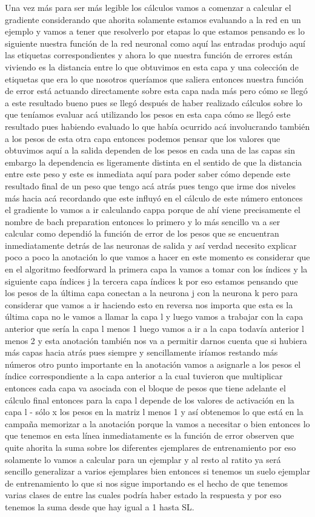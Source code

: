Una vez más para ser más legible los cálculos vamos a comenzar a calcular el gradiente considerando que ahorita solamente estamos evaluando a la red en un ejemplo y vamos a tener que resolverlo por etapas lo que estamos pensando es lo siguiente nuestra función de la red neuronal como aquí las entradas produjo aquí las etiquetas correspondientes y ahora lo que nuestra función de errores están viviendo es la distancia entre lo que obtuvimos en esta capa y una colección de etiquetas que era lo que nosotros queríamos que saliera entonces nuestra función de error está actuando directamente sobre esta capa nada más pero cómo se llegó a este resultado bueno pues se llegó después de haber realizado cálculos sobre lo que teníamos evaluar acá utilizando los pesos en esta capa cómo se llegó este resultado pues habiendo evaluado lo que había ocurrido acá involucrando también a los pesos de esta otra capa entonces podemos pensar que los valores que obtuvimos aquí a la salida dependen de los pesos en cada una de las capas sin embargo la dependencia es ligeramente distinta en el sentido de que la distancia entre este peso y este es inmediata aquí para poder saber cómo depende este resultado final de un peso que tengo acá atrás pues tengo que irme dos niveles más hacia acá recordando que este influyó en el cálculo de este número entonces el gradiente lo vamos a ir calculando cappa porque de ahí viene precisamente el nombre de bach preparation entonces lo primero y lo más sencillo va a ser calcular como dependió la función de error de los pesos que se encuentran inmediatamente detrás de las neuronas de salida y así verdad necesito explicar poco a poco la anotación lo que vamos a hacer en este momento es considerar que en el algoritmo feedforward la primera capa la vamos a tomar con los índices y la siguiente capa índices j la tercera capa índices k por eso estamos pensando que los pesos de la última capa conectan a la neurona j con la neurona k pero para considerar que vamos a ir haciendo esto en reversa nos importa que esta es la última capa no le vamos a llamar la capa l y luego vamos a trabajar con la capa anterior que sería la capa l menos 1 luego vamos a ir a la capa todavía anterior l menos 2 y esta anotación también nos va a permitir darnos cuenta que si hubiera más capas hacia atrás pues siempre y sencillamente iríamos restando más números otro punto importante en la anotación vamos a asignarle a los pesos el índice correspondiente a la capa anterior a la cual tuvieron que multiplicar entonces cada capa va asociada con el bloque de pesos que tiene adelante el cálculo final entonces para la capa l depende de los valores de activación en la capa l - sólo x los pesos en la matriz l menos 1 y así obtenemos lo que está en la campaña memorizar a la anotación porque la vamos a necesitar o bien entonces lo que tenemos en esta línea inmediatamente es la función de error observen que quite ahorita la suma sobre los diferentes ejemplares de entrenamiento por eso solamente lo vamos a calcular para un ejemplar y al resto al ratito ya será sencillo generalizar a varios ejemplares bien entonces si tenemos un suelo ejemplar de entrenamiento lo que si nos sigue importando es el hecho de que tenemos varias clases de entre las cuales podría haber estado la respuesta y por eso tenemos la suma desde que hay igual a 1 hasta SL. 
